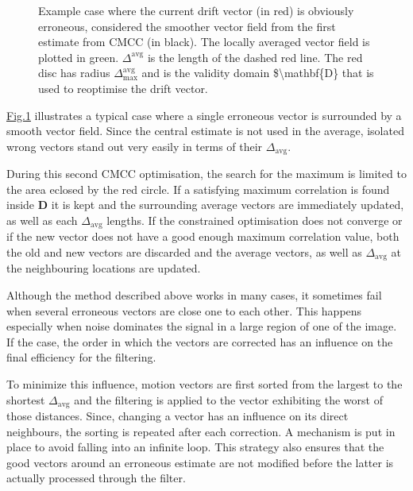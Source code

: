 \documentclass[letterpaper,10pt,english]{jupyterBook}
\begin{document}
\begin{figure}[htbp]
\centering
\capstart

\noindent{}
\caption{Example case where the current drift vector (in red) is obviously erroneous, considered the smoother vector field from the first estimate from
CMCC (in black). The locally averaged vector field is plotted in green. \(\Delta^{\textrm{avg}}\) is the length of the dashed red line.
The red disc has radius \(\Delta^{\textrm{avg}}_{\textrm{max}}\) and is the validity domain \$\textbackslash{}mathbf\{D\} that is used to re\sphinxhyphen{}optimise the drift vector.}\label{\detokenize{baseline_algorithm_definition:fig-filter}}\end{figure}

\sphinxAtStartPar
\hyperref[\detokenize{baseline_algorithm_definition:fig-filter}]{Fig.\@ \ref{\detokenize{baseline_algorithm_definition:fig-filter}}} illustrates a typical case where a single erroneous vector is surrounded by a smooth vector field. Since the central estimate is not used in the
average, isolated wrong vectors stand out very easily in terms of their \(\Delta_{\textrm{avg}}\).

\sphinxAtStartPar
During this second CMCC optimisation, the search for the maximum is limited to the area eclosed by the red circle. If a satisfying maximum
correlation is found inside \(\mathbf{D}\) it is kept and the surrounding average vectors are immediately updated, as well as each
\(\Delta_{\textrm{avg}}\) lengths. If the constrained optimisation does not converge or if the new vector does not have a good enough maximum
correlation value, both the old and new vectors are discarded and the average vectors, as well as \(\Delta_{\textrm{avg}}\) at the neighbouring
locations are updated.

\sphinxAtStartPar
Although the method described above works in many cases, it sometimes fail when several erroneous vectors are close one to each other. This
happens especially when noise dominates the signal in a large region of one of the image. If the case, the order in which the vectors are
corrected has an influence on the final efficiency for the filtering.

\sphinxAtStartPar
To minimize this influence, motion vectors are first sorted from the largest to the shortest \(\Delta_{\textrm{avg}}\) and the filtering is
applied to the vector exhibiting the worst of those distances. Since, changing a vector has an influence on its direct neighbours, the sorting
is repeated after each correction. A mechanism is put in place to avoid falling into an infinite loop. This strategy also ensures that the good
vectors around an erroneous estimate are not modified before the latter is actually processed through the filter.
\end{document}
